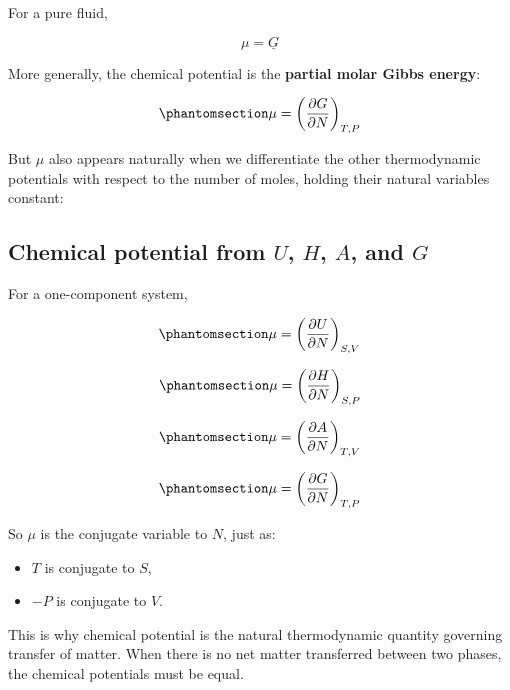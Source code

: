 \documentclass[
  letterpaper,
  DIV=11,
  numbers=noendperiod]{scrartcl}
\providecommand{\tightlist}{%
  \setlength{\itemsep}{0pt}\setlength{\parskip}{0pt}}
\begin{document}
For a pure fluid,

\[
\mu = \underline{G}
\]

More generally, the chemical potential is the \textbf{partial molar
Gibbs energy}:

\begin{equation}\phantomsection\label{eq-chemical-potential}{
\mu = \left( \frac{\partial G}{\partial N} \right)_{T,P} 
}\end{equation}

But \(\mu\) also appears naturally when we differentiate the other
thermodynamic potentials with respect to the number of moles, holding
their natural variables constant:

\subsection{\texorpdfstring{Chemical potential from \(U\), \(H\), \(A\),
and
\(G\)}{Chemical potential from U, H, A, and G}}\label{chemical-potential-from-u-h-a-and-g}

For a one-component system,

\begin{equation}\phantomsection\label{eq-mu-from-U}{
\mu = \left( \frac{\partial U}{\partial N} \right)_{S,V} 
}\end{equation}

\begin{equation}\phantomsection\label{eq-mu-from-H}{
\mu = \left( \frac{\partial H}{\partial N} \right)_{S,P}   
}\end{equation}

\begin{equation}\phantomsection\label{eq-mu-from-A}{
\mu = \left( \frac{\partial A}{\partial N} \right)_{T,V} 
}\end{equation}

\begin{equation}\phantomsection\label{eq-mu-from-G}{
\mu = \left( \frac{\partial G}{\partial N} \right)_{T,P} 
}\end{equation}

So \(\mu\) is the conjugate variable to \(N\), just as:

\begin{itemize}
\tightlist
\item
  \(T\) is conjugate to \(S\),
\item
  \(-P\) is conjugate to \(V\).
\end{itemize}

This is why chemical potential is the natural thermodynamic quantity
governing transfer of matter. When there is no net matter transferred
between two phases, the chemical potentials must be equal.
\end{document}
